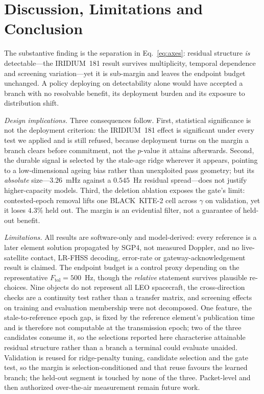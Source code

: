 \documentclass[conference]{IEEEtran}
\begin{document}
\section{Discussion, Limitations and Conclusion}
\label{sec:conclusion}

The substantive finding is the separation in Eq.~\eqref{eq:axes}: residual
structure \emph{is} detectable---the IRIDIUM~181 result survives multiplicity,
temporal dependence and screening variation---yet it is sub-margin and leaves the
endpoint budget unchanged. A policy deploying on detectability alone would have
accepted a branch with no resolvable benefit, its deployment burden and its
exposure to distribution shift.

\emph{Design implications.} Three consequences follow. First, statistical
significance is not the deployment criterion: the IRIDIUM~181 effect is
significant under every test we applied and is still refused, because deployment
turns on the margin a branch clears before commitment, not the $p$-value it
attains afterwards. Second, the durable signal is selected by the stale-age ridge
wherever it appears, pointing to a low-dimensional ageing bias rather than
unexploited pass geometry; but its \emph{absolute} size---$3.26$~mHz against a
$0.545$~Hz residual spread---does not justify higher-capacity models. Third, the
deletion ablation exposes the gate's limit: contested-epoch removal lifts one
BLACK~KITE-2 cell across $\gamma$ on validation, yet it loses $4.3\%$ held out.
The margin is an evidential filter, not a guarantee of held-out benefit.

\emph{Limitations.} All results are software-only and model-derived: every
reference is a later element solution propagated by SGP4, not measured Doppler,
and no live-satellite contact, LR-FHSS decoding, error-rate or
gateway-acknowledgement result is claimed. The endpoint budget is a control proxy
depending on the representative $F_{\mathrm{tol}}=500$~Hz, though the
\emph{relative} statement survives plausible re-choices. Nine objects do not
represent all LEO spacecraft, the cross-direction checks are a continuity test
rather than a transfer matrix, and screening effects on training and evaluation
membership were not decomposed. One feature, the stale-to-reference epoch gap, is
fixed by the reference element's publication time and is therefore not computable
at the transmission epoch; two of the three candidates consume it, so the
selections reported here characterise attainable residual structure rather than a
branch a terminal could evaluate unaided. Validation is reused
for ridge-penalty tuning, candidate selection and the gate test, so the margin is
selection-conditioned and that reuse favours the learned branch; the held-out
segment is touched by none of the three. Packet-level and then authorized
over-the-air measurement remain future work.
\end{document}
